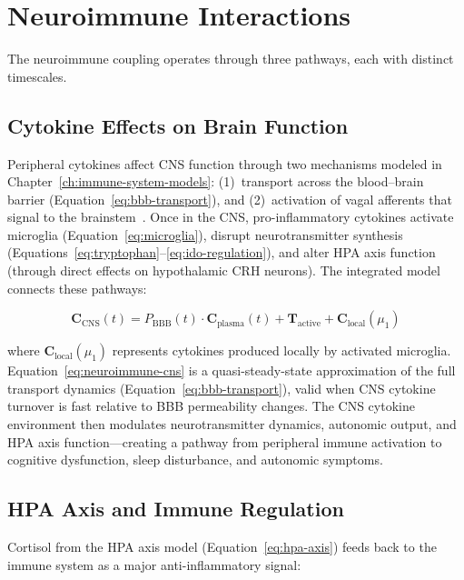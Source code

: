 \section{Neuroimmune Interactions}
\label{sec:neuroimmune-interactions}

The neuroimmune coupling operates through three pathways, each with distinct timescales.

\subsection{Cytokine Effects on Brain Function}

Peripheral cytokines affect CNS function through two mechanisms modeled in Chapter~\ref{ch:immune-system-models}: (1)~transport across the blood--brain barrier (Equation~\ref{eq:bbb-transport}), and (2)~activation of vagal afferents that signal to the brainstem~\cite{Dantzer2007twenty}. Once in the CNS, pro-inflammatory cytokines activate microglia (Equation~\ref{eq:microglia}), disrupt neurotransmitter synthesis (Equations~\ref{eq:tryptophan}--\ref{eq:ido-regulation}), and alter HPA axis function (through direct effects on hypothalamic CRH neurons). The integrated model connects these pathways:

\begin{equation}
\label{eq:neuroimmune-cns}
\boldsymbol{C}_{\text{CNS}}(t) = P_{\text{BBB}}(t) \cdot \boldsymbol{C}_{\text{plasma}}(t) + \boldsymbol{T}_{\text{active}} + \boldsymbol{C}_{\text{local}}(\mu_1)
\end{equation}

where $\boldsymbol{C}_{\text{local}}(\mu_1)$ represents cytokines produced locally by activated microglia. Equation~\ref{eq:neuroimmune-cns} is a quasi-steady-state approximation of the full transport dynamics (Equation~\ref{eq:bbb-transport}), valid when CNS cytokine turnover is fast relative to BBB permeability changes. The CNS cytokine environment then modulates neurotransmitter dynamics, autonomic output, and HPA axis function---creating a pathway from peripheral immune activation to cognitive dysfunction, sleep disturbance, and autonomic symptoms.

\subsection{HPA Axis and Immune Regulation}

Cortisol from the HPA axis model (Equation~\ref{eq:hpa-axis}) feeds back to the immune system as a major anti-inflammatory signal:

